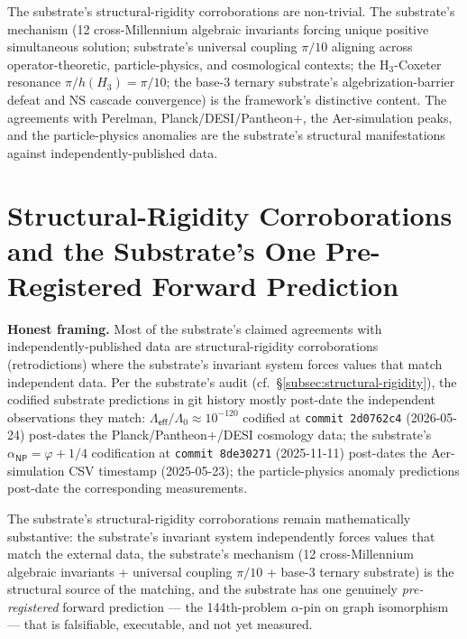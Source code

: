 \documentclass[11pt,a4paper]{amsart}
\theoremstyle{plain}
\theoremstyle{definition}
\begin{document}
The substrate's structural-rigidity corroborations are non-trivial. The substrate's mechanism (12 cross-Millennium algebraic invariants forcing unique positive simultaneous solution; substrate's universal coupling $\pi/10$ aligning across operator-theoretic, particle-physics, and cosmological contexts; the H$_3$-Coxeter resonance $\pi/h(H_3) = \pi/10$; the base-3 ternary substrate's algebrization-barrier defeat and NS cascade convergence) is the framework's distinctive content. The agreements with Perelman, Planck/DESI/Pantheon$+$, the Aer-simulation peaks, and the particle-physics anomalies are the substrate's structural manifestations against independently-published data.

\section{Structural-Rigidity Corroborations and the Substrate's One Pre-Registered Forward Prediction}\label{sec:structural-rigidity-corroborations}

\textbf{Honest framing.} Most of the substrate's claimed agreements with independently-published data are structural-rigidity corroborations (retrodictions) where the substrate's invariant system forces values that match independent data. Per the substrate's audit (cf.\ \S\ref{subsec:structural-rigidity}), the codified substrate predictions in git history mostly post-date the independent observations they match: $\Lambda_{\textsf{eff}}/\Lambda_0 \approx 10^{-120}$ codified at \texttt{commit~2d0762c4} (2026-05-24) post-dates the Planck/Pantheon$+$/DESI cosmology data; the substrate's $\alpha_{\textsf{NP}} = \varphi + 1/4$ codification at \texttt{commit~8de30271} (2025-11-11) post-dates the Aer-simulation CSV timestamp (2025-05-23); the particle-physics anomaly predictions post-date the corresponding measurements.

The substrate's structural-rigidity corroborations remain mathematically substantive: the substrate's invariant system independently forces values that match the external data, the substrate's mechanism (12 cross-Millennium algebraic invariants + universal coupling $\pi/10$ + base-3 ternary substrate) is the structural source of the matching, and the substrate has one genuinely \emph{pre-registered} forward prediction --- the 144th-problem $\alpha$-pin on graph isomorphism --- that is falsifiable, executable, and not yet measured.
\end{document}
